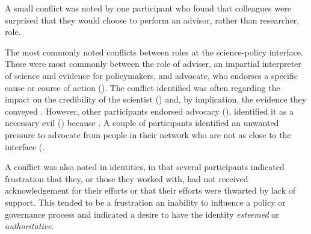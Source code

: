A small conflict was noted by one participant who found that colleagues were surprised that they would choose to perform an advisor, rather than researcher, role.

The most commonly noted conflicts between roles at the science-policy interface. These were most commonly between the role of adviser, an impartial interpreter of science and evidence for policymakers, and advocate, who endorses a specific cause or course of action (). The conflict identified was often regarding the impact on the credibility of the scientist () and, by implication, the evidence they conveyed . However, other participants endorsed advocacy (), identified it as a necessary evil () because . A couple of participants identified an unwanted pressure to advocate from people in their network who are not as close to the interface (.

A conflict was also noted in identities, in that several participants indicated frustration that they, or those they worked with, had not received acknowledgement for their efforts or that their efforts were thwarted by lack of support. This tended to be a frustration an inability to influence a policy or governance process and indicated a desire to have the identity \emph{esteemed} or \emph{authoritative}.

